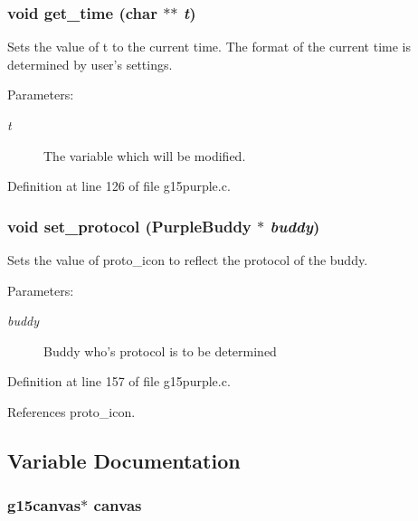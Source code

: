 \subsubsection{\setlength{\rightskip}{0pt plus 5cm}void get\_\-time (char $\ast$$\ast$ {\em t})}\label{g15purple_8c_04757d69ae4a9c45504161a4ad380ce7}


Sets the value of t to the current time. The format of the current time is determined by user's settings.

\begin{Desc}
\item[Parameters:]
\begin{description}
\item[{\em t}]The variable which will be modified. \end{description}
\end{Desc}


Definition at line 126 of file g15purple.c.
\subsubsection{\setlength{\rightskip}{0pt plus 5cm}void set\_\-protocol (PurpleBuddy $\ast$ {\em buddy})}\label{g15purple_8c_e8d346319f12f81572b5322dac14c652}


Sets the value of proto\_\-icon to reflect the protocol of the buddy.

\begin{Desc}
\item[Parameters:]
\begin{description}
\item[{\em buddy}]Buddy who's protocol is to be determined \end{description}
\end{Desc}


Definition at line 157 of file g15purple.c.

References proto\_\-icon.

\subsection{Variable Documentation}
\subsubsection{\setlength{\rightskip}{0pt plus 5cm}g15canvas$\ast$ {\bf canvas}}\label{g15purple_8c_546b3d456a434d548ddc6751d1de8c8f}




